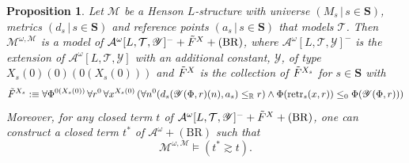 \documentclass[11pt]{amsart}
\newtheorem{proposition}[theorem]{Proposition}
\theoremstyle{definition}
\theoremstyle{remark}
\def\RR{\mathbb{R}}
\begin{document}
\begin{proposition}
\label{lem:majmainresult}
Let $\mathscr{M}$ be a Henson $L$-structure with universe $(M_s\,|\, s \in \mathbf{S})$, metrics $(d_s\,|\, s \in \mathbf{S})$ and reference points $(a_s\,|\, s \in \mathbf{S})$ that models $\mathcal{T}$. Then $\mathcal{M}^{\omega,\mathscr{M}}$ is a model of $\mathcal{A}^\omega[L,\mathcal{T},\mathscr{Y}]^-+\Tilde{F}^X+(\mathrm{BR})$, where $\mathcal{A}^\omega[L,\mathcal{T},\mathscr{Y}]^-$ is the extension of $\mathcal{A}^\omega[L,\mathcal{T},\mathscr{Y}]$ with an additional constant, $\mathscr{Y}$, of type $X_s(0)(0)(0(X_s(0)))$ and $\Tilde{F}^X$ is the collection of $\Tilde{F}^{X_s}$ for $s \in \mathbf{S}$ with
\[
\Tilde{F}^{X_s}:\equiv \forall \Phi^{0(X_s(0))}\,\forall r^0\, \forall x^{X_s(0)}\,(\forall n^0(d_s(\mathscr{Y}(\Phi,r)(n),a_s) \le_\RR r)\land\Phi(\mathrm{retr}_s(x,r))\le_0 \Phi(\mathscr{Y}(\Phi,r)))
\]
Moreover, for any closed term $t$ of $\mathcal{A}^\omega[L,\mathcal{T},\mathscr{Y}]^-+\Tilde{F}^X+(\mathrm{BR})$, one can construct a closed term $t^*$ of $\mathcal{A}^\omega+(\mathrm{BR})$ such that
\[
\mathcal{M}^{\omega,\mathscr{M}}\models\left( t^*\gtrsim t\right).
\]
\end{proposition}
\end{document}
